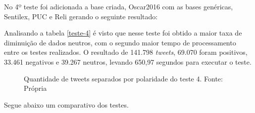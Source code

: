 No 4º teste foi adicionada a base criada, Oscar2016 com as bases genéricas, Sentilex, PUC e  Reli  gerando o seguinte resultado:
\begin{table}[]
	\caption{4º teste}
	\label{teste-4}
\end{table}

Analisando a tabela \ref{teste-4} é visto que nesse teste foi obtido a maior taxa de diminuição de dados neutros, com o segundo maior tempo de processamento entre os testes realizados. O resultado de 141.798 \textit{tweets}, 69.070 foram positivos, 33.461 negativos e 39.267 neutros, levando 650,97 segundos para executar o teste.

\begin{figure}[!h]
	\centering{}
	\caption{Quantidade de tweets separados por polaridade do teste 4. Fonte: Própria}
	\label{teste-graf-4}
\end{figure}
Segue abaixo um comparativo dos testes.

